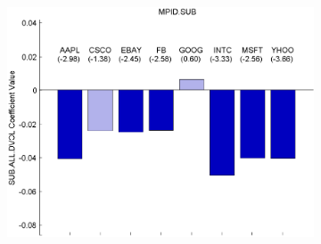 \documentclass{article}
\begin{document}
\begin{figure}[htp!]
\begin{subfigure}{0.31\textwidth}
\includegraphics[width=\linewidth]{docs/Regression_Ratio_30sec_1_SUB_ALL_DVOL.pdf}
\end{subfigure}


\end{figure}
\end{document}
